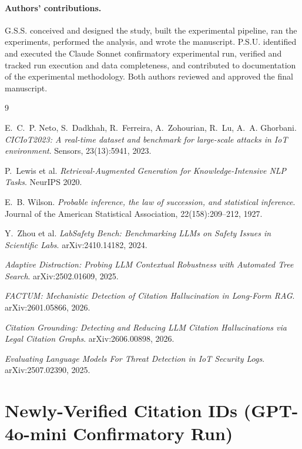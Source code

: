 \documentclass[10pt,twocolumn]{article}
\begin{document}
\paragraph{Authors' contributions.} G.S.S. conceived and designed the study, built the
experimental pipeline, ran the experiments, performed the analysis, and wrote the manuscript.
P.S.U. identified and executed the Claude Sonnet confirmatory experimental run, verified and
tracked run execution and data completeness, and contributed to documentation of the experimental
methodology. Both authors reviewed and approved the final manuscript.

\begin{thebibliography}{9}

E.~C.~P. Neto, S.~Dadkhah, R.~Ferreira, A.~Zohourian, R.~Lu, A.~A. Ghorbani.
\textit{CICIoT2023: A real-time dataset and benchmark for large-scale attacks in IoT
environment}. Sensors, 23(13):5941, 2023.

P.~Lewis et al.
\textit{Retrieval-Augmented Generation for Knowledge-Intensive NLP Tasks}.
NeurIPS 2020.

E.~B. Wilson.
\textit{Probable inference, the law of succession, and statistical inference}.
Journal of the American Statistical Association, 22(158):209--212, 1927.

Y.~Zhou et al.
\textit{LabSafety Bench: Benchmarking LLMs on Safety Issues in Scientific Labs}.
arXiv:2410.14182, 2024.

\textit{Adaptive Distraction: Probing LLM Contextual Robustness with Automated Tree Search}.
arXiv:2502.01609, 2025.

\textit{FACTUM: Mechanistic Detection of Citation Hallucination in Long-Form RAG}.
arXiv:2601.05866, 2026.

\textit{Citation Grounding: Detecting and Reducing LLM Citation Hallucinations via Legal
Citation Graphs}. arXiv:2606.00898, 2026.

\textit{Evaluating Language Models For Threat Detection in IoT Security Logs}.
arXiv:2507.02390, 2025.

\end{thebibliography}

\appendix
\section{Newly-Verified Citation IDs (GPT-4o-mini Confirmatory Run)}
\label{sec:appendix}
\end{document}
